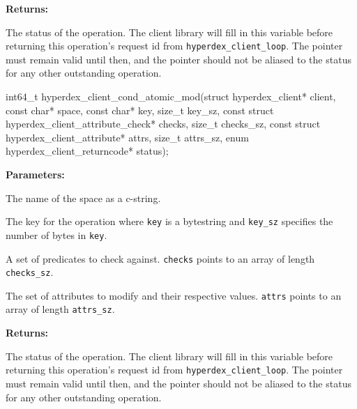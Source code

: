 \noindent\textbf{Returns:}
\begin{description}[labelindent=\widthof{{\texttt{status}}},leftmargin=*,noitemsep,nolistsep,align=right]
\item[\texttt{status}] The status of the operation.  The client library will fill in this variable before returning this operation's request id from \texttt{hyperdex\_client\_loop}.  The pointer must remain valid until then, and the pointer should not be aliased to the status for any other outstanding operation.
\end{description}

\funcsep
\begin{ccode}
int64_t hyperdex_client_cond_atomic_mod(struct hyperdex_client* client,
                const char* space,
                const char* key, size_t key_sz,
                const struct hyperdex_client_attribute_check* checks, size_t checks_sz,
                const struct hyperdex_client_attribute* attrs, size_t attrs_sz,
                enum hyperdex_client_returncode* status);
\end{ccode}
\funcdesc 

\noindent\textbf{Parameters:}
\begin{description}[labelindent=\widthof{{\texttt{checks}, \texttt{checks\_sz}}},leftmargin=*,noitemsep,nolistsep,align=right]
\item[\texttt{space}] The name of the space as a c-string.
\item[\texttt{key}, \texttt{key\_sz}] The key for the operation where \texttt{key} is a bytestring and \texttt{key\_sz} specifies the number of bytes in \texttt{key}.
\item[\texttt{checks}, \texttt{checks\_sz}] A set of predicates to check against.  \texttt{checks} points to an array of length \texttt{checks\_sz}.
\item[\texttt{attrs}, \texttt{attrs\_sz}] The set of attributes to modify and their respective values.  \texttt{attrs} points to an array of length \texttt{attrs\_sz}.
\end{description}

\noindent\textbf{Returns:}
\begin{description}[labelindent=\widthof{{\texttt{status}}},leftmargin=*,noitemsep,nolistsep,align=right]
\item[\texttt{status}] The status of the operation.  The client library will fill in this variable before returning this operation's request id from \texttt{hyperdex\_client\_loop}.  The pointer must remain valid until then, and the pointer should not be aliased to the status for any other outstanding operation.
\end{description}

